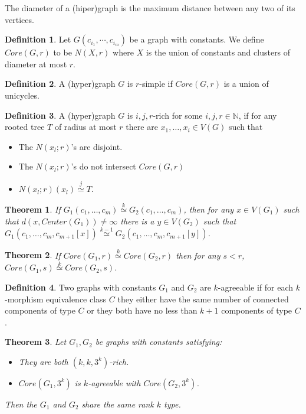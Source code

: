 \documentclass[11pt,notitlepage]{report}
\newtheorem{theorem}{Theorem}[chapter]
\theoremstyle{definition}
\newtheorem{definition}{Definition}[chapter]
\newcommand{\N}{\mathbb{N}}
\newcommand{\clist}{c_{i_1}, \cdots, c_{i_m}}
\newcommand{\morph}[1]{\stackrel{#1}{\simeq}}
\begin{document}
The diameter of a (hiper)graph is the maximum distance between any two of its vertices. 

\begin{definition} 
	Let $G(\clist)$ be a graph with constants. We define $Core(G,r)$ to be
	$N(X,r)$ where $X$ is the union of constants and clusters of diameter at most $r$. 
\end{definition}


\begin{definition} 
	A (hyper)graph $G$ is $r$-simple if $Core(G,r)$ is a union of unicycles. 
\end{definition}

\begin{definition}
	A (hyper)graph $G$ is $i,j,r$-rich for some $i,j,r\in \N$, if for any rooted tree $T$
	of radius at most $r$ there are $x_1,\dots,x_i\in V(G)$ such that
	\begin{itemize}
		\item The $N(x_l;r)$'s are disjoint.
		\item The $N(x_l;r)$'s do not intersect $Core(G,r)$
		\item $N(x_l;r)(x_l) \morph{j} T$.		
	\end{itemize} 
\end{definition}


\begin{theorem}
	If $G_1(c_1,\dots,c_m)\morph{k} G_2(c_1,\dots,c_m)$, then for any $x\in V(G_1)$ such 
	that $d(x,Center(G_1))\neq \infty$ there is a $y\in V(G_2)$ such that
	$G_1(c_1,\dots,c_m,c_{m+1}[x])\morph{k-1} G_2(c_1,\dots,c_m,c_{m+1}[y])$.
\end{theorem}

\begin{theorem}
	If $Core(G_1,r)\morph{k} Core(G_2,r)$ then for any $s<r$, $Core(G_1,s)\morph{k} Core(G_2,s)$.
\end{theorem}


\begin{definition} 
	Two graphs with constants $G_1$ and $G_2$ are $k$-agreeable if for each $k$-morphism 
	equivalence class $C$ they either have the same number of connected components of type
	$C$ or they both have no less than $k+1$ components of type $C$. 
\end{definition}


\begin{theorem} 
	Let $G_1, G_2$ be graphs with constants satisfying:
	\begin{itemize}
		\item They are both $(k, k, 3^k)$-rich.
		\item $Core(G_1,3^k)$ is $k$-agreeable with $Core(G_2,3^k)$.
	\end{itemize} 
	Then the $G_1$ and $G_2$ share the same rank $k$ type.
\end{theorem}
\end{document}
